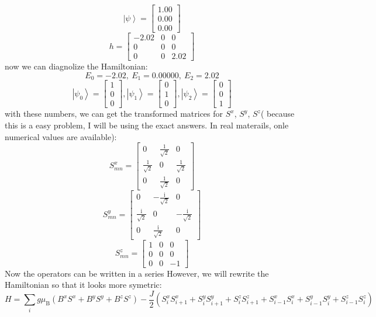 \documentclass[letter]{article}
\newcommand{\ii}{\mathrm{i}}
\begin{document}
$$
\left|\psi\right>=\begin{bmatrix}
    1.00 \\
0.00 \\
0.00
    \end{bmatrix}
$$
$$
h=\begin{bmatrix}
    -2.02 & 0 & 0 \\
    0 &  0 & 0 \\
    0 &  0 & 2.02
    \end{bmatrix}
$$
now we can diagnolize the Hamiltonian:
$$E_{0}=-2.02,\ E_{1}=0.00000,\ E_{2}=2.02
$$
$$\left|\psi_0\right>=\begin{bmatrix}
    1 \\
0 \\
0
    \end{bmatrix},\left|\psi_1\right>=\begin{bmatrix}
       0 \\
    1 \\
    0
        \end{bmatrix},\left|\psi_2\right>=\begin{bmatrix}
            0 \\
            0 \\
            1
            \end{bmatrix}
$$
with these numbers, we can get the transformed matrices for $S^x$, $S^y$, $S^z$( because this is a easy problem, I will be using the exact answers. In real materails, onle numerical values are available):
$$S^x_{mn}=\begin{bmatrix}
    0& \frac{1}{\sqrt{2}} & 0\\
    \frac{1}{\sqrt{2}} &  0 & \frac{1}{\sqrt{2}}\\
0& \frac{1}{\sqrt{2}}&0
    \end{bmatrix}$$$$
S^y_{mn}=\begin{bmatrix}
    0& -\frac{\ii}{\sqrt{2}} & 0\\
    \frac{\ii}{\sqrt{2}} &  0 & -\frac{\ii}{\sqrt{2}}\\
0& \frac{\ii}{\sqrt{2}}&0
    \end{bmatrix}$$ $$
S^z_{mn}=\begin{bmatrix}
1 & 0 & 0 \\
0 &  0 & 0 \\
0 &  0 & -1
\end{bmatrix}
$$
Now the operators can be written in a series However, we will rewrite the Hamiltonian so that it looks more symetric: \\
$$
H=\sum_{i}g\mu_{\mathrm{B}}(B^x S^x +B^y S^y+B^z S^z)-\frac{J}{2}(S_{i}^x S_{i+1}^x+S_{i}^y S_{i+1}^y+S_{i}^z S_{i+1}^z+S_{i-1}^x S_{i}^x+S_{i-1}^y S_{i}^y+S_{i-1}^z S_{i}^z)$$
\end{document}
